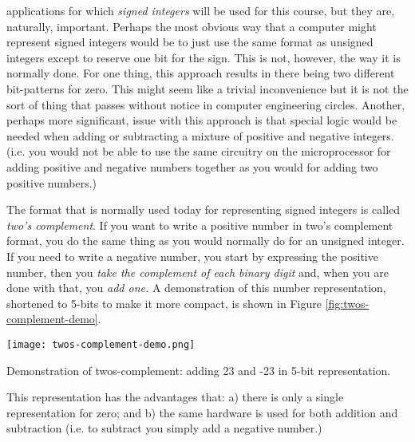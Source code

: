  applications for which \emph{signed integers} will be used for this course, but they are, naturally, important.  Perhaps the most obvious way that a computer might represent signed integers would be to just use the same format as unsigned integers except to reserve one bit for the sign.  This is not, however, the way it is normally done.  For one thing, this approach results in there being two different bit-patterns for zero.  This might seem like a trivial inconvenience but it is not the sort of thing that passes without notice in computer engineering circles. Another, perhaps more significant, issue with this approach is that special logic would be needed when adding or subtracting a mixture of positive and negative integers. (i.e. you would not be able to use the same circuitry on the microprocessor for adding positive and negative numbers together as you would for adding two positive numbers.)
  
The format that is normally used today for representing signed integers is called \emph{two's complement}.  If you want to write a positive number in two's complement format, you do the same thing as you would normally do for an unsigned integer. If you need to write a negative number, you start by expressing the positive number, then you \emph{take the complement of each binary digit} and, when you are done with that, you \emph{add one.} A demonstration of this number representation, shortened to 5-bits to make it more compact, is shown in Figure \ref{fig:twos-complement-demo}.  


\begin{marginfigure}
\texttt{[image: twos-complement-demo.png]}
\caption{Demonstration of twos-complement: adding 23 and -23 in 5-bit representation.}
\label{fig:twos-complement-demo}
\end{marginfigure}


This representation has the advantages that: a) there is only a single representation for zero; and b) the same hardware is used for both addition and subtraction (i.e. to subtract you simply add a negative number.)

